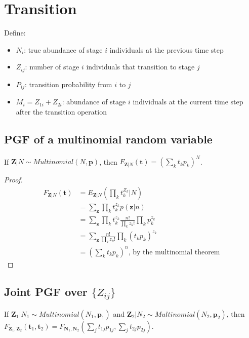 \documentclass{article}
\begin{document}
\section{Transition}
Define:
\begin{itemize}
\item $N_i$: true abundance of stage $i$ individuals at the previous time step
\item $Z_{ij}$: number of stage $i$ individuals that transition to stage $j$
\item $P_{ij}$: transition probability from $i$ to $j$
\item $M_i = Z_{1i} + Z_{2i}$: abundance of stage $i$ individuals at the current time step after the transition operation
\end{itemize}

\subsection{PGF of a multinomial random variable}
If $\mathbf{Z}|N \sim Multinomial(N, \mathbf{p})$, then $F_{\mathbf{Z}|N}(\mathbf{t}) = (\sum_k t_k p_k)^N$.

\begin{proof}
\begin{align*}
F_{\mathbf{Z}|N}(\mathbf{t}) &= E_{\mathbf{Z}|N}(\prod_k t_k^{Z_k}|N) \\
&= \sum_\mathbf{z} \prod_k t_k^{z_k} p(\mathbf{z}|n) \\
&= \sum_\mathbf{z} \prod_k t_k^{z_k} \frac{n!}{\prod_k z_k!} \prod_k p_k^{z_k} \\
&= \sum_\mathbf{z} \frac{n!}{\prod_k z_k!} \prod_k (t_k p_k)^{z_k} \\
&= (\sum_k t_k p_k)^n \text{, by the multinomial theorem}
\end{align*}
\end{proof}

\subsection{Joint PGF over $\{Z_{ij}\}$}
If $\mathbf{Z}_1|N_1 \sim Multinomial(N_1, \mathbf{p}_1)$ and $\mathbf{Z}_2|N_2 \sim Multinomial(N_2, \mathbf{p}_2)$, then $F_{\mathbf{Z}_1, \mathbf{Z}_2}(\mathbf{t}_1, \mathbf{t}_2) = F_{\mathbf{N}_1, \mathbf{N}_2}(\sum_j  t_{1j} p_{1j}, \sum_j t_{2j} p_{2j})$.
\end{document}
